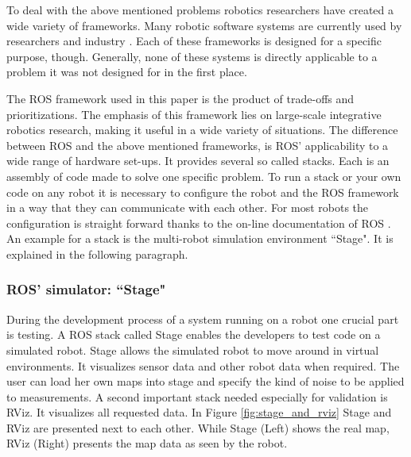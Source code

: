 \documentclass{ba-kecs}
\begin{document}
To deal with the above mentioned problems robotics researchers have created a wide variety of frameworks. Many robotic software systems are currently used by researchers and industry \cite{Kramer}. Each of these frameworks is designed for a specific purpose, though. Generally, none of these systems is directly applicable to a problem it was not designed for in the first place.

The ROS framework used in this paper is the product of trade-offs and prioritizations. The emphasis of this framework lies on large-scale integrative robotics research, making it useful in a wide variety of situations. The difference between ROS and the above mentioned frameworks, is ROS' applicability to a wide range of hardware set-ups. It provides several so called stacks. Each is an assembly of code made to solve one specific problem. To run a stack or your own code on any robot it is necessary to configure the robot and the ROS framework in a way that they can communicate with each other. For most robots the configuration is straight forward thanks to the on-line documentation of ROS \citep{Roswiki}.  An example for a stack is the multi-robot simulation environment ``Stage". It is explained in the following paragraph.

\subsubsection{ROS' simulator: ``Stage"}
During the development process of a system running on a robot one crucial part is testing. A ROS stack called Stage enables the developers to test code on a simulated robot. Stage allows the simulated robot to move around in virtual environments. It visualizes sensor data and other robot data when required. The user can load her own maps into stage and specify the kind of noise to be applied to measurements. A second important stack needed especially for validation is RViz. It visualizes all requested data. In Figure \ref{fig:stage_and_rviz} Stage and RViz are presented next to each other. While Stage (Left) shows the real map, RViz (Right) presents the map data as seen by the robot.
\end{document}
